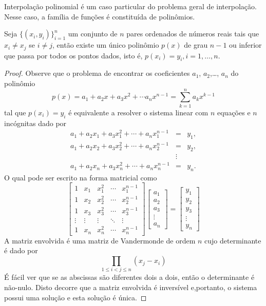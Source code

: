 Interpolação polinomial é um caso particular do problema geral de interpolação. Nesse caso, a família de funções é constituída de polinômios.

\begin{teo}\label{teo_interp_poli} Seja $\{(x_i,y_i)\}_{i=1}^{n}$ um conjunto de $n$ pares ordenados de números reais tais que $x_i \ne x_j$ se $i\ne j$, então existe um único polinômio $p(x)$ de grau $n-1$ ou inferior que passa por todos os pontos dados, isto é, $p(x_i)=y_i, i=1,\ldots, n$.
\end{teo}
\begin{proof} Observe que o problema de encontrar os coeficientes $a_1$, $a_2$,\ldots, $a_n$ do polinômio
$$p(x)=a_1+a_2x+a_3x^2+\cdots a_nx^{n-1}=\sum_{k=1}^n a_k x^{k-1}$$
tal que $p(x_i)=y_i$ é equivalente a resolver o sistema linear com $n$ equações e $n$ incógnitas dado por
\begin{eqnarray*}
a_1+a_2x_1+a_3x_1^2+\cdots +a_n x_1^{n-1}&=&y_1,\\
a_1+a_2x_2+a_3x_2^2+\cdots +a_n x_2^{n-1}&=&y_2,\\
&\vdots&\\
a_1+a_2x_n+a_3x_n^2+\cdots +a_n x_n^{n-1}&=&y_n.
\end{eqnarray*}
O qual pode ser escrito na forma matricial como
$$\begin{bmatrix}
1 & x_1 & x_1^2 & \cdots & x_1^{n-1}\\
1 & x_2 & x_2^2 & \cdots & x_2^{n-1}\\
1 & x_3 & x_3^2 & \cdots & x_3^{n-1}\\
\vdots&\vdots&\vdots&\ddots&\vdots\\
1 & x_n & x_n^2 & \cdots & x_n^{n-1}
\end{bmatrix}
\begin{bmatrix}
a_1\\a_2\\a_3\\ \vdots \\a_n
\end{bmatrix}=
\begin{bmatrix}
y_1\\y_2\\y_3\\ \vdots \\y_n
\end{bmatrix}
$$
A matriz envolvida é uma matriz de Vandermonde de ordem $n$ cujo determinante é dado por
$$\prod_{1\leq i<j\leq n}\left(x_j-x_i\right)$$
É fácil ver que se as abscissas são diferentes dois a dois, então o determinante é não-nulo. Disto decorre que a matriz envolvida é inversível e,portanto, o sistema possui uma solução e esta solução é única.
\end{proof}


